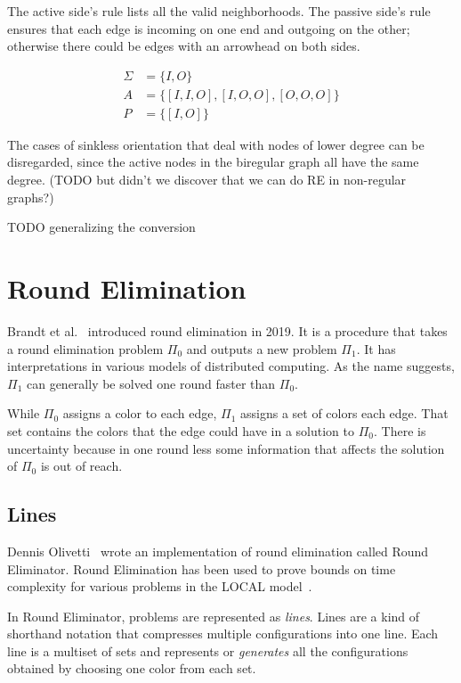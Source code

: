 \documentclass[english, 12pt, a4paper, sci, a-1b, online]{aaltothesis}
\begin{document}
The active side's rule lists all the valid neighborhoods. The passive side's rule ensures that each edge is incoming on one end and outgoing on the other; otherwise there could be edges with an arrowhead on both sides.

\begin{align*}
\Sigma &= \{I, O\} \\
A &= \{[I, I, O], [I, O, O], [O, O, O]\} \\
P &= \{[I, O]\}
\end{align*}

The cases of sinkless orientation that deal with nodes of lower degree can be disregarded, since the active nodes in the biregular graph all have the same degree. (TODO but didn't we discover that we can do RE in non-regular graphs?)

TODO generalizing the conversion

\section{Round Elimination}

Brandt et al.~\cite{speedup} introduced round elimination in 2019. It is a procedure that takes a round elimination problem $\Pi_0$ and outputs a new problem $\Pi_1$. It has interpretations in various models of distributed computing. As the name suggests, $\Pi_1$ can generally be solved one round faster than $\Pi_0$.

While $\Pi_0$ assigns a color to each edge, $\Pi_1$ assigns a set of colors each edge. That set contains the colors that the edge could have in a solution to $\Pi_0$. There is uncertainty because in one round less some information that affects the solution of $\Pi_0$ is out of reach.

\subsection{Lines}

Dennis Olivetti~\cite{RE} wrote an implementation of round elimination called Round Eliminator. Round Elimination has been used to prove bounds on time complexity for various problems in the LOCAL model~\cite{tc1, tc2, tc3}.

In Round Eliminator, problems are represented as \emph{lines}. Lines are a kind of shorthand notation that compresses multiple configurations into one line. Each line is a multiset of sets and represents or \emph{generates} all the configurations obtained by choosing one color from each set.~\cite{RE}
\end{document}
